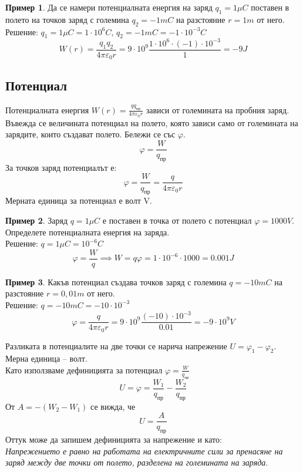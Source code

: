 \documentclass[fleqn, 12pt]{article}
\theoremstyle{definition}
\newtheorem{example}{Пример}[subsection]
\begin{document}
\begin{example}
Да се намери потенциалната енергия на заряд $q_1 = 1 \mu C$ поставен в
полето на точков заряд с големина $q_2 = -1 mC$ на разстояние $r = 1 m$ от него. \\
Решение: $q_1 = 1 \mu C = 1 \cdot 10^6 C, \, q_2 = -1 mC = -1 \cdot 10^{-3} C$
$$W(r) = \frac{q_1 q_2}{4 \pi \varepsilon_0 r}  = 9 \cdot 10^9 \frac{1 \cdot 10^6 \cdot (-1) \cdot 10^{-3} }{1} = -9 J$$
\end{example}

\subsection{Потенциал}
Потенциалната енергия $W(r) =  \frac{q q_{\text{пр}}}{4 \pi \varepsilon_0 r}$ зависи от големината на пробния заряд. \\
Въвежда се величината потенциал на полето, която зависи само от големината на
зарядите, които създават полето. Бележи се със $\varphi$.
$$\varphi = \frac{W}{q_{\text{пр}}}$$ 
За точков заряд потенциалът е: 
$$\varphi = \frac{W}{q_{\text{пр}}} = \frac{q}{4 \pi \varepsilon_0 r}$$
Мерната единица за потенциал е волт V. 

\begin{example}
Заряд $q = 1 \mu C$ е поставен в точка от полето с потенциал $\varphi = 1000 V$.
Определете потенциалната енергия на заряда.\\
Решение: $q = 1 \mu C = 10^{-6}C$
$$\varphi = \frac{W}{q} \implies W = q\varphi = 1 \cdot 10^{-6} \cdot 1000 = 0.001 J$$
\end{example}

\begin{example}
Какъв потенциал създава точков заряд с големина $q = -10 mC$ на
разстояние $r = 0,01m$ от него. \\
Решение: $q = -10 mC = -10 \cdot 10^{-3}$
$$\varphi = \frac{q}{4 \pi \varepsilon_0 r} = 9 \cdot 10^9 \frac{(-10) \cdot 10^{-3}}{0.01} = -9 \cdot 10^9 V$$
\end{example}
Разликата в потенциалите на две точки се нарича напрежение $U = \varphi_1 - \varphi_2$. Мерна
единица – волт. \\
Като използваме дефиницията за потенциал $\varphi = \frac{W}{q_{\text{пр}}}$
$$U = \varphi = \frac{W_1}{q_{\text{пр}}} - \frac{W_2}{q_{\text{пр}}}$$
От $A =- (W_2 - W_1)$ се вижда, че 
$$U = \frac{A}{q_{\text{пр}}}$$
Оттук може да запишем дефиницията за
напрежение и като:\\
\textit{Напрежението е равно на работата на електричните сили за
пренасяне на заряд между две точки от полето, разделена на големината на заряда}.
\end{document}
